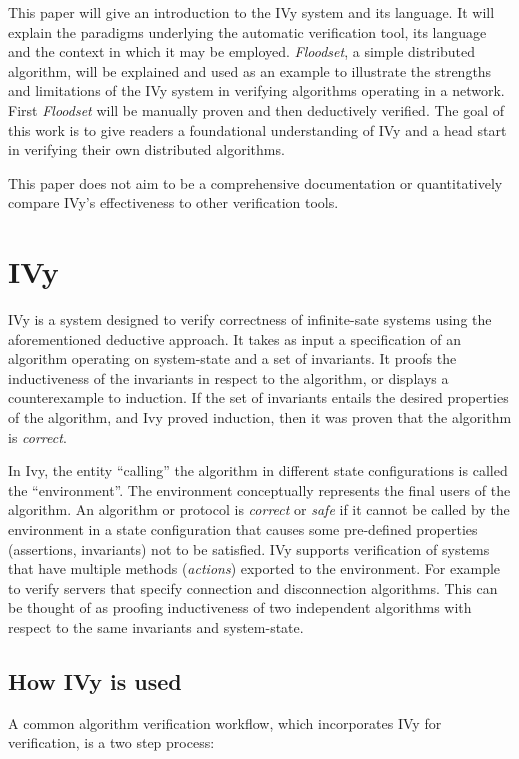 \documentclass[fleqn]{article}
\begin{document}
  This paper will give an introduction to the IVy system and its language. It will explain the paradigms underlying the automatic verification tool, its language and the context in which it may be employed.  \textit{Floodset}, a simple distributed algorithm, will be explained and used as an example to illustrate the strengths and limitations of the IVy system in verifying algorithms operating in a network. First \textit{Floodset} will be manually proven and then deductively verified.  The goal of this work is to give readers a foundational understanding of IVy and a head start in verifying their own distributed algorithms.

  This paper does not aim to be a comprehensive documentation or quantitatively compare IVy's effectiveness to other verification tools.

\section{IVy}
IVy is a system designed to verify correctness of infinite-sate systems using the aforementioned deductive approach. It takes as input a specification of an algorithm operating on system-state  and a set of invariants. It proofs the inductiveness of the invariants in respect to the algorithm, or displays a counterexample to induction. If the set of invariants entails the desired properties of the algorithm, and Ivy proved induction, then it was proven that the algorithm is \textit{correct}.

In Ivy, the entity ``calling'' the algorithm in different state configurations is called the ``environment''. The environment conceptually represents the final users of the algorithm. An algorithm or protocol is \textit{correct} or \textit{safe} if it cannot be called by the environment in a state configuration that causes some pre-defined properties (assertions, invariants) not to be satisfied. IVy supports verification of systems that have multiple methods (\textit{actions}) exported to the environment. For example to verify servers that specify connection and disconnection algorithms. This can be thought of as proofing inductiveness of two independent algorithms with respect to the same invariants and system-state.

\subsection{How IVy is used}

A common algorithm verification workflow, which incorporates IVy for verification, is a two step process:
\end{document}
